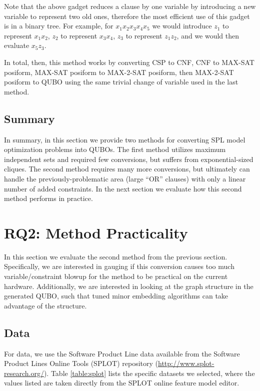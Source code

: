\documentclass{sig-alternate-05-2015}
\begin{document}
Note that the above gadget reduces a clause by one variable by introducing a new variable to represent two old ones, therefore the most efficient use of this gadget is in a binary tree. For example, for $x_1 x_2  x_3  x_4 x_5$ we would introduce $z_1$ to represent $x_1 x_2$, $z_2$ to represent $x_3 x_4$, $z_3$ to represent $z_1 z_2$, and we would then evaluate $x_5 z_3$.

In total, then, this method works by converting CSP to CNF, CNF to MAX-SAT posiform, MAX-SAT posiform to MAX-2-SAT posiform, then MAX-2-SAT posiform to QUBO using the same trivial change of variable used in the last method.

\subsection{Summary}

In summary, in this section we provide two methods for converting SPL model optimization problems into QUBOs. The first method utilizes maximum independent sets and required few conversions, but suffers from exponential-sized cliques. The second method requires many more conversions, but ultimately can handle the previously-problematic area (large ``OR'' clauses) with only a linear number of added constraints. In the next section we evaluate how this second method performs in practice.


\section{RQ2: Method Practicality}

In this section we evaluate the second method from the previous section. Specifically, we are interested in gauging if this conversion causes too much variable/constraint blowup for the method to be practical on the current hardware. Additionally, we are interested in looking at the graph structure in the generated QUBO, such that tuned minor embedding algorithms can take advantage of the structure.

\subsection{Data}
For data, we use the Software Product Line data available from the Software Product Lines Online Tools (SPLOT) repository (\url{http://www.splot-research.org/}). Table \ref{table:splot} lists the specific datasets we selected, where the values listed are taken directly from the SPLOT online feature model editor.
\end{document}
